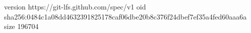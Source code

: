 version https://git-lfs.github.com/spec/v1
oid sha256:0484c1a08dd4632391825178caf06dbe20b8c376f24dbef7ef35a4fed60aaa6a
size 196704

